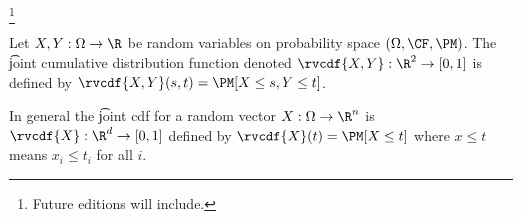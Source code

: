 
\footnote{Future editions will include.}


Let $X, Y: \Omega \to \R$ be random variables on probability space $(\Omega, \CF, \PM)$.
The \t{joint cumulative distribution function} denoted $\rvcdf{X,Y}: \R^2 \to [0, 1]$ is defined by $\rvcdf{X,Y}(s,t) = \PM[X \leq s, Y \leq t]$.

In general the \t{joint cdf} for a random vector $X: \Omega \to \R^n$ is $\rvcdf{X}: \R^d \to [0,1]$ defined by
$\rvcdf{X}(t) = \PM[X \leq t]$ where $x \leq t$ means $x_i \leq t_i$ for all $i$.

\blankpage
